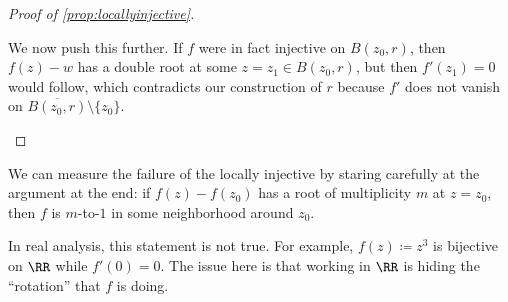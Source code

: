 \begin{proof}[Proof of \autoref{prop:locallyinjective}]
\begin{itemize}
		We now push this further. If $f$ were in fact injective on $B(z_0,r)$, then $f(z)-w$ has a double root at some $z=z_1\in B(z_0,r)$, but then $f'(z_1)=0$ would follow, which contradicts our construction of $r$ because $f'$ does not vanish on $\overline{B(z_0,r)}\setminus\{z_0\}$.
		\qedhere
	\end{itemize}
\end{proof}
\begin{remark}
	We can measure the failure of the locally injective by staring carefully at the argument at the end: if $f(z)-f(z_0)$ has a root of multiplicity $m$ at $z=z_0$, then $f$ is $m$-to-$1$ in some neighborhood around $z_0$. 
\end{remark}
\begin{nex}
	In real analysis, this statement is not true. For example, $f(z)\coloneqq z^3$ is bijective on $\RR$ while $f'(0)=0$. The issue here is that working in $\RR$ is hiding the ``rotation'' that $f$ is doing.
\end{nex}

